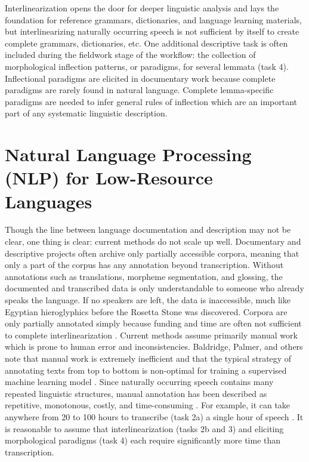 Interlinearization opens the door for deeper linguistic analysis and lays the foundation for reference grammars, dictionaries, and language learning materials, but interlinearizing naturally occurring speech is not sufficient by itself to create complete grammars, dictionaries, etc. One additional descriptive task is often included during the fieldwork stage of the workflow: the collection of morphological inflection patterns, or paradigms, for several lemmata (task 4). Inflectional paradigms are elicited in documentary work because complete paradigms are rarely found in natural language. Complete lemma-specific paradigms are needed to infer general rules of inflection which are an important part of any systematic linguistic description.


\section{Natural Language Processing (NLP) for Low-Resource Languages}

Though the line between language documentation and description may not be clear, one thing is clear: current methods do not scale up well. Documentary and descriptive projects often archive only partially accessible corpora, meaning that only a part of the corpus has any annotation beyond transcription. Without annotations such as translations, morpheme segmentation, and glossing, the documented and transcribed data is only understandable to someone who already speaks the language. If no speakers are left, the data is inaccessible, much like Egyptian hieroglyphics before the Rosetta Stone was discovered. Corpora are only partially annotated simply because funding and time are often not sufficient to complete interlinearization \citep{cox_taking_2019}. Current methods assume primarily manual work which is prone to human error and inconsistencies. Baldridge, Palmer, and others note that manual work is extremely inefficient and that the typical strategy of annotating texts from top to bottom is non-optimal for training a supervised machine learning model \citep{Baldridge06,baldridge_how_2009,palmer_semi-automated_2009}. Since naturally occurring speech contains many repeated linguistic structures, manual annotation has been described as repetitive, monotonous, costly, and time-consuming \citep{duong_natural_2017,he_humanloop_2016}. For example, it can take anywhere from 20 to 100 hours to transcribe (task 2a) a single hour of speech \citep{seifart_language_2018}. It is reasonable to assume that interlinearization (tasks 2b and 3) and eliciting morphological paradigms (task 4) each require significantly more time than transcription.  

